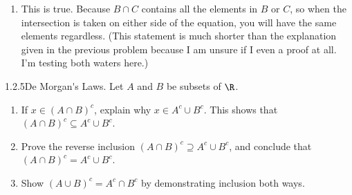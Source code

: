 {\begin{enumerate}
\begin{enumerate}[label=(\arabic*)]
                        \begin{enumerate}[label=\roman*.]
                            \item \textbf{If the set inside the parenthesis is not empty}, then we have \(y\) and \(z \in B \cap C\). Then it could be the case that \(y\) and \(z \in A\). From this, we know 2 things can occur. Either every set contains only \(y\), or \(y\) and \(z\).
                            \item \textbf{If the set inside the parenthesis is empty}, then the resulting intersection with \(A\) would be the empty set.
                        \end{enumerate}
                  \item In every case, either we get the empty set, or end up in a situation where every set contains just \(y\) or all elements. Hence, the two sides of the equation will always equal each other.
              \end{enumerate}
        \item This is true. Because \(B \cap C\) contains all the elements in \(B\) or \(C\), so when the intersection is taken on either side of the equation, you will have the same elements regardless. (This statement is much shorter than the explanation given in the previous problem because I am unsure if I even a proof at all. I'm testing both waters here.)
    \end{enumerate}
}

\newpage
\begin{exercise}
    {1.2.5}\Gls{De Morgan's Laws}. Let \(A\) and \(B\) be subsets of \(\R\).
    \begin{enumerate}
        \item  If \(x \in (A \cap B)^c\), explain why \(x \in A^c \cup B^c\). This shows that \((A \cap B)^c \subseteq A^c \cup B^c\).
        \item Prove the reverse inclusion \((A \cap B)^c \supseteq A^c \cup B^c\), and conclude that \((A \cap B)^c = A^c \cup B^c\).
        \item Show \((A \cup B)^c = A^c \cap B^c\) by demonstrating inclusion both ways.
    \end{enumerate}
\end{exercise}

